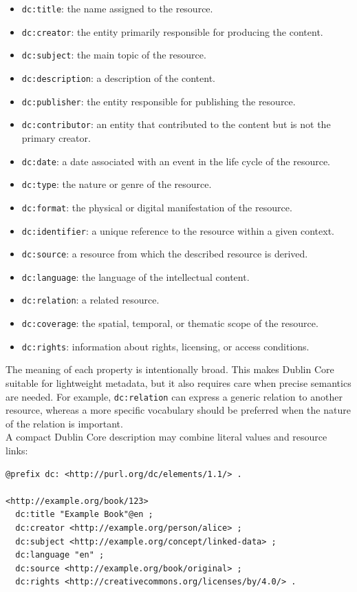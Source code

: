 \documentclass{scrbook}
\begin{document}
	\begin{itemize}
	    \item \texttt{dc:title}: the name assigned to the resource.
	    \item \texttt{dc:creator}: the entity primarily responsible for producing the content.
	    \item \texttt{dc:subject}: the main topic of the resource.
	    \item \texttt{dc:description}: a description of the content.
	    \item \texttt{dc:publisher}: the entity responsible for publishing the resource.
	    \item \texttt{dc:contributor}: an entity that contributed to the content but is not the primary creator.
	    \item \texttt{dc:date}: a date associated with an event in the life cycle of the resource.
	    \item \texttt{dc:type}: the nature or genre of the resource.
	    \item \texttt{dc:format}: the physical or digital manifestation of the resource.
	    \item \texttt{dc:identifier}: a unique reference to the resource within a given context.
	    \item \texttt{dc:source}: a resource from which the described resource is derived.
	    \item \texttt{dc:language}: the language of the intellectual content.
	    \item \texttt{dc:relation}: a related resource.
	    \item \texttt{dc:coverage}: the spatial, temporal, or thematic scope of the resource.
	    \item \texttt{dc:rights}: information about rights, licensing, or access conditions.
	\end{itemize}
	
	The meaning of each property is intentionally broad. This makes Dublin Core suitable for lightweight metadata, but it also requires care when precise semantics are needed. For example, \texttt{dc:relation} can express a generic relation to another resource, whereas a more specific vocabulary should be preferred when the nature of the relation is important.\\
	
	A compact Dublin Core description may combine literal values and resource links:
	
	\begin{lstlisting}
@prefix dc: <http://purl.org/dc/elements/1.1/> .
	
<http://example.org/book/123>
  dc:title "Example Book"@en ;
  dc:creator <http://example.org/person/alice> ;
  dc:subject <http://example.org/concept/linked-data> ;
  dc:language "en" ;
  dc:source <http://example.org/book/original> ;
  dc:rights <http://creativecommons.org/licenses/by/4.0/> .
	\end{lstlisting}
	
\end{document}
